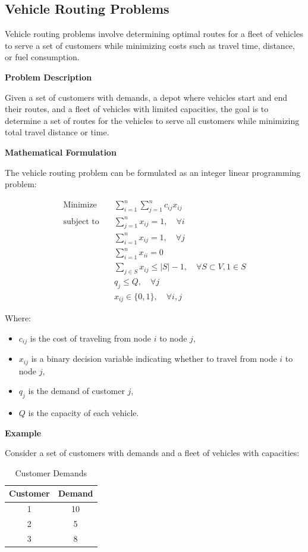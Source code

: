 \documentclass[12pt]{book} %
\begin{document}
\subsection{Vehicle Routing Problems}

Vehicle routing problems involve determining optimal routes for a fleet of vehicles to serve a set of customers while minimizing costs such as travel time, distance, or fuel consumption.

\textbf{Problem Description}

Given a set of customers with demands, a depot where vehicles start and end their routes, and a fleet of vehicles with limited capacities, the goal is to determine a set of routes for the vehicles to serve all customers while minimizing total travel distance or time.

\textbf{Mathematical Formulation}

The vehicle routing problem can be formulated as an integer linear programming problem:

\[
\begin{aligned}
\text{Minimize} \quad & \sum_{i=1}^{n} \sum_{j=1}^{n} c_{ij} x_{ij} \\
\text{subject to} \quad & \sum_{j=1}^{n} x_{ij} = 1, \quad \forall i \\
& \sum_{i=1}^{n} x_{ij} = 1, \quad \forall j \\
& \sum_{i=1}^{n} x_{ii} = 0 \\
& \sum_{j \in S} x_{ij} \leq |S| - 1, \quad \forall S \subset V, 1 \in S \\
& q_j \leq Q, \quad \forall j \\
& x_{ij} \in \{0, 1\}, \quad \forall i, j
\end{aligned}
\]

Where:
\begin{itemize}
    \item $c_{ij}$ is the cost of traveling from node $i$ to node $j$,
    \item $x_{ij}$ is a binary decision variable indicating whether to travel from node $i$ to node $j$,
    \item $q_j$ is the demand of customer $j$,
    \item $Q$ is the capacity of each vehicle.
\end{itemize}

\textbf{Example}

Consider a set of customers with demands and a fleet of vehicles with capacities:

\begin{table}[H]
    \centering
    \begin{tabular}{|c|c|}
    \hline
    Customer & Demand \\
    \hline
    1 & 10 \\
    2 & 5 \\
    3 & 8 \\
    \hline
    \end{tabular}
    \caption{Customer Demands}
\end{table}
\end{document}
